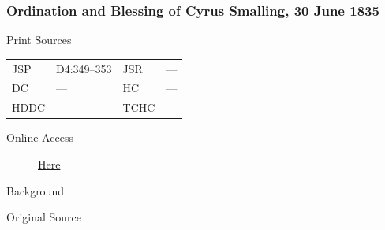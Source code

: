 		\subsubsection{Ordination and Blessing of Cyrus Smalling, 30 June 1835}
			\label{EMS-1835-JS-30-JUN-1835}
			
			\begin{description}
				\item[Print Sources]
			\end{description}

				\begin{tabular}{p{0.5in}p{1in}p{0.5in}p{1in}}
				JSP	 	& D4:349--353		& JSR 		& --- \\
				DC	 	& --- 		& HC 		& --- \\
				HDDC 	& ---		& TCHC 		& --- \\
				\end{tabular}
			
			\begin{description}
				\item[Online Access] \href{https://www.josephsmithpapers.org/paper-summary/ordination-and-blessing-of-cyrus-smalling-30-june-1835/1}{Here}
			\end{description}
			
			\begin{description}
				\item[Background]
			\end{description}
			
			
			\begin{description}
				\item[Original Source]
			\end{description}
			
			

